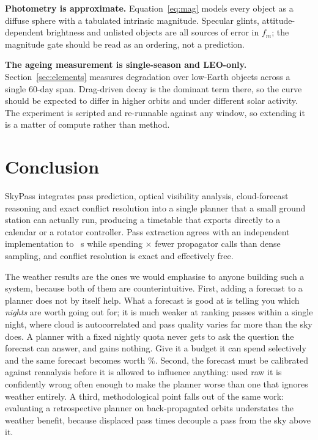 \documentclass[conference]{IEEEtran}
\begin{document}
\textbf{Photometry is approximate.} Equation~\eqref{eq:mag} models every object
as a diffuse sphere with a tabulated intrinsic magnitude. Specular glints,
attitude-dependent brightness and unlisted objects are all sources of error in
$f_m$; the magnitude gate should be read as an ordering, not a prediction.

\textbf{The ageing measurement is single-season and LEO-only.}
Section~\ref{sec:elements} measures degradation over \AgeObjects{} low-Earth
objects across a single 60-day span. Drag-driven decay is the dominant term
there, so the curve should be expected to differ in higher orbits and under
different solar activity. The experiment is scripted and re-runnable against any
window, so extending it is a matter of compute rather than method.

\section{Conclusion}

SkyPass integrates pass prediction, optical visibility analysis, cloud-forecast
reasoning and exact conflict resolution into a single planner that a small ground
station can actually run, producing a timetable that exports directly to a
calendar or a rotator controller. Pass extraction agrees with an independent
implementation to \SkyfieldTca~s while spending \CallReduction$\times$ fewer
propagator calls than dense sampling, and conflict resolution is exact and
effectively free.

The weather results are the ones we would emphasise to anyone building such a
system, because both of them are counterintuitive. First, adding a forecast to a
planner does not by itself help. What a forecast is good at is telling you which
\emph{nights} are worth going out for; it is much weaker at ranking passes
within a single night, where cloud is autocorrelated and pass quality varies far
more than the sky does. A planner with a fixed nightly quota never gets to ask
the question the forecast can answer, and gains nothing. Give it a budget it can
spend selectively and the same forecast becomes worth \BudgetGainClear\%.
Second, the forecast must be calibrated against reanalysis before it is allowed
to influence anything: used raw it is confidently wrong often enough to make the
planner worse than one that ignores weather entirely. A third, methodological
point falls out of the same work: evaluating a retrospective planner on
back-propagated orbits understates the weather benefit, because displaced pass
times decouple a pass from the sky above it.
\end{document}

